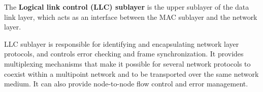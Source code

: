The \textbf{Logical link control (LLC) sublayer} is the upper sublayer of the data link layer, which acts as an
interface between the MAC sublayer and the network layer.
\ed

LLC sublayer is responsible for identifying and encapsulating network layer protocols, and controls error checking
and frame synchronization. It provides multiplexing mechanisms that make it possible for several network protocols to
coexist within a multipoint network and to be transported over the same network medium. It can also provide
node-to-node flow control and error management.

%
